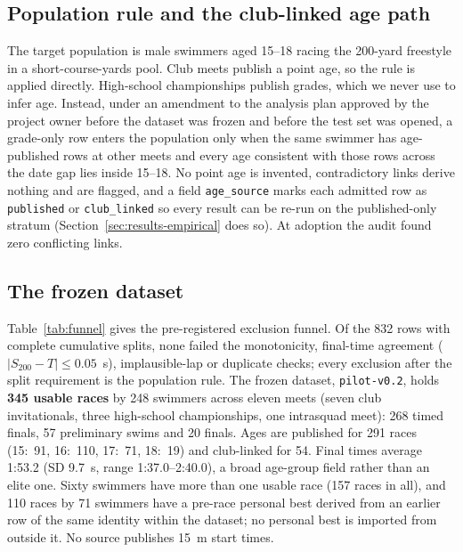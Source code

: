 \subsection{Population rule and the club-linked age path}

The target population is male swimmers aged 15--18 racing the 200-yard
freestyle in a short-course-yards pool. Club meets publish a point age, so
the rule is applied directly. High-school championships publish grades,
which we never use to infer age. Instead, under an amendment to the
analysis plan approved by the project owner before the dataset was frozen
and before the test set was opened, a grade-only row enters the population
only when the same swimmer has age-published rows at other meets and every
age consistent with those rows across the date gap lies inside 15--18. No
point age is invented, contradictory links derive nothing and are flagged,
and a field \texttt{age\_source} marks each admitted row as
\texttt{published} or \texttt{club\_linked} so every result can be re-run on
the published-only stratum (Section~\ref{sec:results-empirical} does so).
At adoption the audit found zero conflicting links.

\subsection{The frozen dataset}

Table~\ref{tab:funnel} gives the pre-registered exclusion funnel. Of the
832 rows with complete cumulative splits, none failed the monotonicity,
final-time agreement ($|S_{200}-T|\le 0.05$~s), implausible-lap or duplicate
checks; every exclusion after the split requirement is the population rule.
The frozen dataset, \texttt{pilot-v0.2}, holds \textbf{345 usable races} by
248 swimmers across eleven meets (seven club invitationals, three
high-school championships, one intrasquad meet): 268 timed finals, 57
preliminary swims and 20 finals. Ages are published for 291 races (15:~91,
16:~110, 17:~71, 18:~19) and club-linked for 54. Final times average
1:53.2 (SD 9.7~s, range 1:37.0--2:40.0), a broad age-group field rather
than an elite one. Sixty swimmers have more than one usable race (157 races
in all), and 110 races by 71 swimmers have a pre-race personal best derived
from an earlier row of the same identity within the dataset; no personal
best is imported from outside it. No source publishes 15~m start times.

